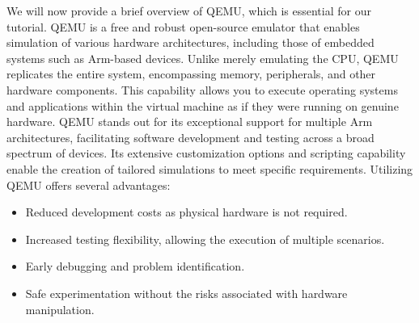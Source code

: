 \documentclass[9pt, reqno]{amsart}
\theoremstyle{definition}
\theoremstyle{remark}
\numberwithin{equation}{section}
\begin{document}
{We will now provide a brief overview of QEMU, which is essential for our tutorial. QEMU is a free and robust open-source emulator that enables simulation of various hardware architectures, including those of embedded systems such as Arm-based devices. Unlike merely emulating the CPU, QEMU replicates the entire system, encompassing memory, peripherals, and other hardware components. This capability allows you to execute operating systems and applications within the virtual machine as if they were running on genuine hardware. QEMU stands out for its exceptional support for multiple Arm architectures, facilitating software development and testing across a broad spectrum of devices\cite{QEMU}. Its extensive customization options and scripting capability enable the creation of tailored simulations to meet specific requirements.
Utilizing QEMU offers several advantages:
\begin{itemize}
    \item Reduced development costs as physical hardware is not required.
    \item Increased testing flexibility, allowing the execution of multiple scenarios.
    \item Early debugging and problem identification.
    \item Safe experimentation without the risks associated with hardware manipulation.
\end{itemize}

}
\end{document}

